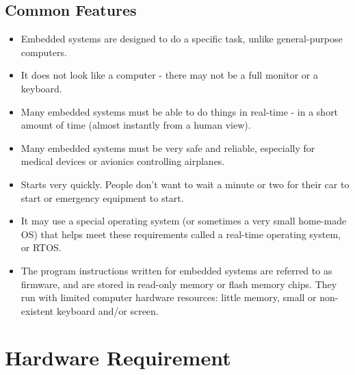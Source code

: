 \documentclass[twoside,a4paper,16pt]{book}
\begin{document}
{\subsection*{Common Features}
\begin{itemize}
	\item Embedded systems are designed to do a specific task, unlike general-purpose computers.
	\item It does not look like a computer - there may not be a full monitor or a keyboard.
	\item Many embedded systems must be able to do things in real-time - in a short amount of time (almost instantly from a human view).
	\item Many embedded systems must be very safe and reliable, especially for medical devices or avionics controlling airplanes.
	\item Starts very quickly. People don't want to wait a minute or two for their car to start or emergency equipment to start.
	\item It may use a special operating system (or sometimes a very small home-made OS) that helps meet these requirements called a real-time operating system, or RTOS.
	\item The program instructions written for embedded systems are referred to as firmware, and are stored in read-only memory or flash memory chips. They run with limited computer hardware resources: little memory, small or non-existent keyboard and/or screen.\\	
\end{itemize}
\section{\bf Hardware Requirement}
}
\end{document}
